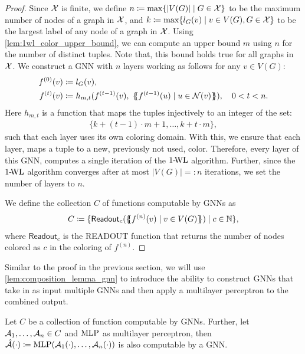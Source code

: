 \begin{proof}
Since $\mathcal{X}$ is finite, we define $n \coloneqq \max \{ |V(G)| \mid G \in \mathcal{X} \}$ to be the maximum number of nodes of a graph in $\mathcal{X}$, and $k \coloneqq \max \{ l_G(v) \mid v \in V(G), G \in \mathcal{X} \}$ to be the largest label of any node of a graph in $\mathcal{X}$. Using \cref{lem:1wl_color_upper_bound}, we can compute an upper bound $m$ using $n$ for the number of distinct tuples. Note that, this bound holds true for all graphs in $\mathcal{X}$. We construct a GNN with $n$ layers working as follows for any $v \in V(G)$: 
\begin{align*}
    f^{(0)}(v) &\coloneqq l_G(v), \\
    f^{(t)}(v) &\coloneqq h_{m,t}(f^{(t-1)}(v), \ \{\!\!\{ f^{(t-1)}(u) \mid u \in \mathcal{N}(v)\}\!\!\}), \quad 0 < t < n.
\end{align*}
Here $h_{m,t}$ is a function that maps the tuples injectively to an integer of the set:
\begin{align*}
    \{k + (t-1)\cdot m +1, \ldots, k + t \cdot m\},
\end{align*}
such that each layer uses its own coloring domain. With this, we ensure that each layer, maps a tuple to a new, previously not used, color. Therefore, every layer of this GNN, computes a single iteration of the $\text{1-\!WL}$ algorithm. Further, since the $\text{1-\!WL}$ algorithm converges after at most $|V(G)| =: n$ iterations, we set the number of layers to $n$.

We define the collection $C$ of functions computable by GNNs as 
\begin{align*}
C \coloneqq \{ \textsf{Readout}_c(\{\!\!\{ f^{(n)}(v) \mid v \in V(G) \}\!\!\}) \mid c \in \mathbb{N} \},
\end{align*}
where $\textsf{Readout}_c$ is the \textsf{READOUT} function that returns the number of nodes colored as $c$ in the coloring of $f^{(n)}$.
\end{proof}

Similar to the proof in the previous section, we will use \cref*{lem:composition_lemma_gnn} to introduce the ability to construct GNNs that take in as input multiple GNNs and then apply a multilayer perceptron to the combined output.


\begin{lemma}\label{lem:composition_lemma_gnn}
    Let $C$ be a collection of function computable by GNNs. Further, let  $\mathcal{A}_1, \dots , \mathcal{A}_n \in C$ and $\text{MLP}$ as multilayer perceptron, then $\hat{\mathcal{A}}(\cdot) \coloneqq \text{MLP}(\mathcal{A}_1(\cdot), \dots, \mathcal{A}_n(\cdot))$ is also computable by a GNN.
\end{lemma}

